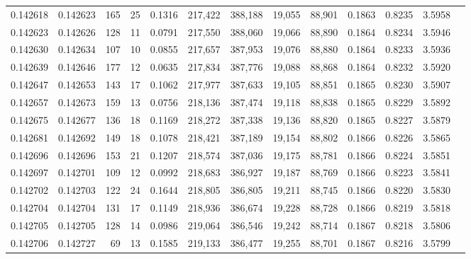 \begin{tabular}{rrrrrrrrrrrrr}
0.142618 & 0.142623 &   165 &  25 &                                     0.1316 & 217,422 & 388,188 &  19,055 &  88,901 & 0.1863 & 0.8235 & 3.5958 \\
0.142623 & 0.142626 &   128 &  11 &                                     0.0791 & 217,550 & 388,060 &  19,066 &  88,890 & 0.1864 & 0.8234 & 3.5946 \\
0.142630 & 0.142634 &   107 &  10 &                                     0.0855 & 217,657 & 387,953 &  19,076 &  88,880 & 0.1864 & 0.8233 & 3.5936 \\
0.142639 & 0.142646 &   177 &  12 &                                     0.0635 & 217,834 & 387,776 &  19,088 &  88,868 & 0.1864 & 0.8232 & 3.5920 \\
0.142647 & 0.142653 &   143 &  17 &                                     0.1062 & 217,977 & 387,633 &  19,105 &  88,851 & 0.1865 & 0.8230 & 3.5907 \\
0.142657 & 0.142673 &   159 &  13 &                                     0.0756 & 218,136 & 387,474 &  19,118 &  88,838 & 0.1865 & 0.8229 & 3.5892 \\
0.142675 & 0.142677 &   136 &  18 &                                     0.1169 & 218,272 & 387,338 &  19,136 &  88,820 & 0.1865 & 0.8227 & 3.5879 \\
0.142681 & 0.142692 &   149 &  18 &                                     0.1078 & 218,421 & 387,189 &  19,154 &  88,802 & 0.1866 & 0.8226 & 3.5865 \\
0.142696 & 0.142696 &   153 &  21 &                                     0.1207 & 218,574 & 387,036 &  19,175 &  88,781 & 0.1866 & 0.8224 & 3.5851 \\
0.142697 & 0.142701 &   109 &  12 &                                     0.0992 & 218,683 & 386,927 &  19,187 &  88,769 & 0.1866 & 0.8223 & 3.5841 \\
0.142702 & 0.142703 &   122 &  24 &                                     0.1644 & 218,805 & 386,805 &  19,211 &  88,745 & 0.1866 & 0.8220 & 3.5830 \\
0.142704 & 0.142704 &   131 &  17 &                                     0.1149 & 218,936 & 386,674 &  19,228 &  88,728 & 0.1866 & 0.8219 & 3.5818 \\
0.142705 & 0.142705 &   128 &  14 &                                     0.0986 & 219,064 & 386,546 &  19,242 &  88,714 & 0.1867 & 0.8218 & 3.5806 \\
0.142706 & 0.142727 &    69 &  13 &                                     0.1585 & 219,133 & 386,477 &  19,255 &  88,701 & 0.1867 & 0.8216 & 3.5799 \\

\end{tabular}
